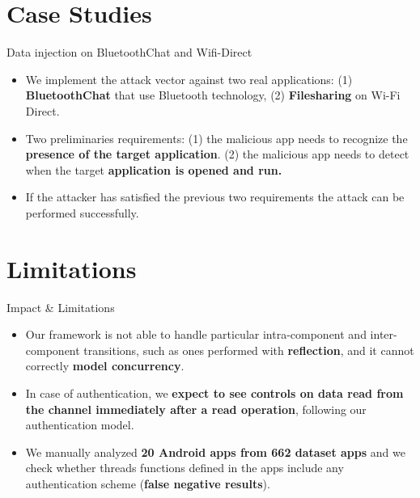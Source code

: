 \documentclass[10pt]{beamer}
\begin{document}
\section{Case Studies}
\begin{frame}[fragile]{Data injection on BluetoothChat and Wifi-Direct}

  \begin{itemize}

  \item We implement the attack vector against two real applications:
    (1) {\bf BluetoothChat} that use Bluetooth technology, (2) {\bf
      Filesharing} on Wi-Fi Direct.

  \item Two preliminaries requirements: (1) the malicious app needs to
    recognize the {\bf presence of the target application}. (2) the
    malicious app needs to detect when the target {\bf application is
      opened and run.}

  \item If the attacker has satisfied the previous two requirements
    the attack can be performed successfully.

  \end{itemize}
  
  
\end{frame}


\section{Limitations}
\begin{frame}[fragile]{Impact \& Limitations}

\begin{itemize}

\item Our framework is not able to handle particular intra-component
  and inter-component transitions, such as ones performed with {\bf
    reflection}, and it cannot correctly {\bf model concurrency}.

\item In case of authentication, we {\bf expect to see controls on
    data read from the channel immediately after a read operation},
  following our authentication model.

\item We manually analyzed {\bf 20 Android apps from 662 dataset apps}
  and we check whether threads functions defined in the apps include
  any authentication scheme ({\bf false negative results}).

\end{itemize}

\end{frame}
\end{document}
